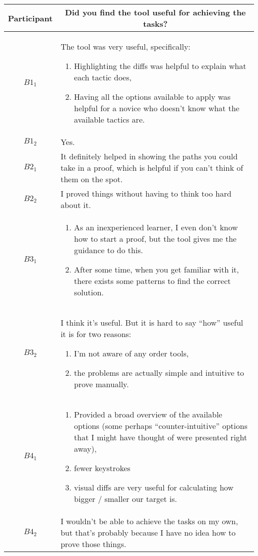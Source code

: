 \noindent
\begin{tabularx}{\linewidth}{@{}cX@{}}
  \toprule
  Participant & \multicolumn{1}{c}{
    \textbf{Did you find the tool useful for achieving the tasks?}
  } \\ \midrule
  $B1_{1}$ & The tool was very useful, specifically: \begin{enumerate} \item Highlighting the diffs was helpful to explain what each tactic does, \item Having all the options available to apply was helpful for a novice who doesn't know what the available tactics are. \end{enumerate} \\
  $B1_{2}$ & Yes. \\
  $B2_{1}$ & It definitely helped in showing the paths you could take in a proof, which is helpful if you can't think of them on the spot. \\
  $B2_{2}$ & I proved things without having to think too hard about it. \\
  $B3_{1}$ & \begin{enumerate} \item As an inexperienced learner, I even don't know how to start a proof, but the tool gives me the guidance to do this. \item After some time, when you get familiar with it, there exists some patterns to find the correct solution. \end{enumerate} \\
  $B3_{2}$ & I think it's useful.  But it is hard to say ``how'' useful it is for two reasons: \begin{enumerate} \item I'm not aware of any order tools, \item the problems are actually simple and intuitive to prove manually. \end{enumerate} \\
  $B4_{1}$ & \begin{enumerate} \item Provided a broad overview of the available options (some perhaps ``counter-intuitive'' options that I might have thought of were presented right away), \item fewer keystrokes \item visual diffs are very useful for calculating how bigger / smaller our target is. \end{enumerate} \\
  $B4_{2}$ & I wouldn't be able to achieve the tasks on my own, but that's probably because I have no idea how to prove those things. \\

\end{tabularx}
